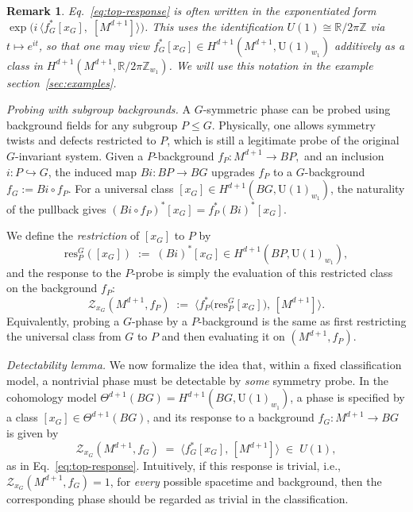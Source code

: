 \documentclass[aps,prx,reprint,superscriptaddress,twocolumn,amsmath,amssymb,amsfonts, nofootinbib]{revtex4-2}
\newcommand{\U}{\text{U}}
\newcommand{\res}{\text{res}}
\theoremstyle{apsstyle}
\newtheorem{remark}[theorem]{Remark}
\begin{document}
\medskip

\begin{remark}
\label{rmk:exp_convention}
 Eq.~\ref{eq:top-response} is often written in the exponentiated form $\exp\bigl(i\,\langle f_{G}^{*}[x_{G}],\; [M^{d+1}] \rangle\bigr)$. This uses the identification $U(1)\cong \mathbb R/2\pi \mathbb Z$ via $t\mapsto e^{i t}$, so that one may view $f_G^*[x_{G}]\in H^{d+1}(M^{d+1},\U(1)_{w_{1}})$ additively as a class in $H^{d+1}(M^{d+1},\mathbb R/2\pi \mathbb Z_{w_{1}})$. We will use this notation in the example section~\ref{sec:examples}.
\end{remark}

\bigskip 


\noindent\textit{Probing with subgroup backgrounds.}
A $G$-symmetric phase can be probed using background fields for any subgroup $P\le G$. Physically, one allows symmetry twists and defects restricted to $P$, which is still a legitimate probe of the original $G$-invariant system. Given a $P$-background $f_P:M^{d+1}\to BP,$ and an inclusion $i:P\hookrightarrow G$, the induced map $Bi:BP\to BG$ upgrades $f_P$ to a $G$-background $f_G:=Bi\circ f_P$. For a universal class $[x_{G}]\in H^{d+1}(BG,\U(1)_{w_{1}})$, the
naturality of the pullback gives $(Bi\circ f_P)^*[x_{G}]=f_P^*(Bi)^*[x_{G}]$. 

\medskip 

\noindent We define the \emph{restriction} of $[x_{G}]$ to $P$ by
\begin{equation*}
\res^G_P([x_{G}])\;:=\;(Bi)^*[x_{G}]\in H^{d+1}(BP,\U(1)_{w_{1}}),
\end{equation*}
and the response to the $P$-probe is simply the evaluation of this restricted class on the background $f_P$:
\begin{equation}
\label{eq:subgroup_probe}
\mathcal Z_{x_{G}}(M^{d+1},f_P)
\;:=\;
\big\langle f_P^*\bigl(\res^G_P[x_{G}]\bigr),\,[M^{d+1}]\big\rangle.
\end{equation}
Equivalently, probing a $G$-phase by a $P$-background is the same as first restricting the universal class from $G$ to $P$ and then evaluating it on $(M^{d+1},f_P)$.

\bigskip

\noindent \textit{Detectability lemma.}
We now formalize the idea that, within a fixed classification model, a nontrivial phase must be detectable by \emph{some} symmetry probe. In the cohomology model $\Theta^{d+1}(BG)=H^{d+1}(BG,\U(1)_{w_{1}})$, a phase is specified by a class 
$[x_{G}]\in \Theta^{d+1}(BG)$, and its response to a background
$f_G : M^{d+1}\to BG$ is given by
\begin{equation*}
  \mathcal Z_{x_{G}}(M^{d+1},f_G)
  \;=\;
  \big\langle f_G^{*}[x_{G}],\,[M^{d+1}]\big\rangle
  \;\in\; U(1),
\end{equation*}
as in Eq.~\ref{eq:top-response}. Intuitively, if this response is trivial, i.e., $\mathcal Z_{x_{G}}(M^{d+1},f_G)=1$, for \emph{every} possible spacetime and background, then the corresponding phase should be regarded as trivial in the classification.
\end{document}
